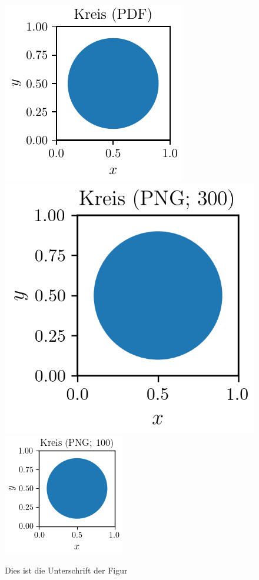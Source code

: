 \documentclass[a4paper, 12pt]{scrartcl}
\begin{document}
%
\begin{figure}[h]
   \centering
   \includegraphics{kreis.pdf}
   \includegraphics{kreis_300.png}
   \includegraphics{kreis_100.png}
   \caption{Dies ist die Unterschrift der Figur}
\end{figure}
\end{document}

